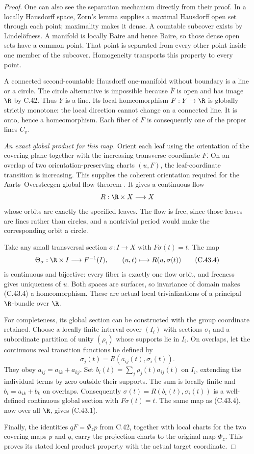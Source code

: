 \begin{proof}
One can also see the separation mechanism
directly from their proof. In a locally
Hausdorff space, Zorn's lemma supplies
a maximal Hausdorff open set through
each point; maximality makes it dense.
A countable subcover exists by
Lindel\"ofness. A manifold is locally
Baire and hence Baire, so those dense
open sets have a common point. That
point is separated from every other
point inside one member of the subcover.
Homogeneity transports this property
to every point.

A connected second-countable Hausdorff
one-manifold without boundary is a line
or a circle. The circle alternative is
impossible because $\overline F$ is open
and has image $\R$ by C.42. Thus $Y$
is a line. Its local homeomorphism
$\overline F:Y\to\R$ is globally
strictly monotone: the local direction
cannot change on a connected line.
It is onto, hence a homeomorphism.
Each fiber of $F$ is consequently one
of the proper lines $C_v$.

\emph{An exact global product for this map.}
Orient each leaf using the orientation
of the covering plane together with
the increasing transverse coordinate
$F$. On an overlap of two
orientation-preserving charts $(u,F)$,
the leaf-coordinate transition is
increasing. This supplies the coherent
orientation required for the
Aarts--Oversteegen global-flow theorem
\cite[Main Theorem 0.5, its proof in
Section 4, and Remark 4.4]
{C_AartsOversteegen1991}.
It gives a continuous flow
\[
 R:\R\times X\longrightarrow X
\]
whose orbits are exactly the specified
leaves. The flow is free, since those
leaves are lines rather than circles,
and a nontrivial period would make
the corresponding orbit a circle.

Take any small transversal section
$\sigma:I\to X$ with $F\sigma(t)=t$.
The map
\[
 \Theta_\sigma:\R\times I\longrightarrow F^{-1}(I),
 \qquad (u,t)\longmapsto R(u,\sigma(t))                 \tag{C.43.4}
\]
is continuous and bijective: every
fiber is exactly one flow orbit, and
freeness gives uniqueness of $u$.
Both spaces are surfaces, so invariance
of domain makes (C.43.4) a homeomorphism.
These are actual local trivializations
of a principal $\R$-bundle over $\R$.

For completeness, its global section
can be constructed with the group
coordinate retained. Choose a locally
finite interval cover $(I_i)$ with
sections $\sigma_i$ and a subordinate
partition of unity $(\rho_i)$ whose
supports lie in $I_i$. On overlaps,
let the continuous real transition
functions be defined by
\[
             \sigma_j(t)=R(a_{ij}(t),\sigma_i(t)).
\]
They obey $a_{ij}=a_{ik}+a_{kj}$.
Set $b_i(t)=\sum_j\rho_j(t)a_{ij}(t)$
on $I_i$, extending the individual
terms by zero outside their supports.
The sum is locally finite and
$b_i=a_{ik}+b_k$ on overlaps.
Consequently
$\sigma(t)=R(b_i(t),\sigma_i(t))$
is a well-defined continuous global
section with $F\sigma(t)=t$.
The same map as (C.43.4), now over
all $\R$, gives (C.43.1).

Finally, the identities
$qF=\Phi_zp$ from C.42, together with
local charts for the two covering
maps $p$ and $q$, carry the projection
charts to the original map $\Phi_z$.
This proves its stated local product
property with the actual target
coordinate.
\end{proof}

